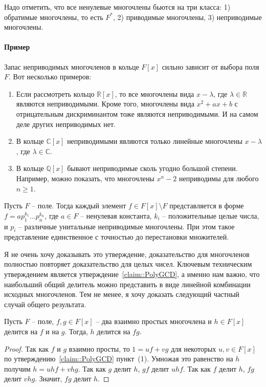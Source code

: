 Надо отметить, что все ненулевые многочлены бьются на три класса: 1) обратимые многочлены, то есть $F^*$, 2) приводимые многочлены, 3) неприводимые многочлены.

\paragraph{Пример}

Запас неприводимых многочленов в кольце $F[x]$ сильно зависит от выбора поля $F$.
Вот несколько примеров:
\begin{enumerate}
\item Если рассмотреть кольцо $\mathbb R[x]$, то все многочлены вида $x - \lambda$, где $\lambda\in \mathbb R$ являются неприводимыми.
Кроме того, многочлены вида $x^2 + ax + b$ с отрицательным дискриминантом тоже являются неприводимыми.
И на самом деле других неприводимых нет.

\item В кольце $\mathbb C[x]$ неприводимыми являются только линейные многочлены $x - \lambda$, где $\lambda \in \mathbb C$.

\item В кольце $\mathbb Q[x]$ бывают неприводимые сколь угодно большой степени.
Например, можно показать, что многочлены $x^n - 2$ неприводимы для любого $n \geqslant 1$.
\end{enumerate}

\begin{claim}
[UFD]
\label{claim::PolyUFD}
Пусть $F$ -- поле.
Тогда каждый элемент $f\in F[x]\setminus F$ представляется в форме $f = a p_1^{k_1}\ldots p_n^{k_n}$, где $a\in F$ -- ненулевая константа, $k_i$ -- положительные целые числа, и $p_i$ -- различные унитальные неприводимые многочлены.
При этом такое представление единственное с точностью до перестановки множителей.
\end{claim}

Я не очень хочу доказывать это утверждение, доказательство для многочленов полностью повторяет доказательство для целых чисел.
Ключевым техническим утверждением является утверждение~\ref{claim::PolyGCD}, а именно нам важно, что наибольший общий делитель можно представить в виде линейной комбинации исходных многочленов.
Тем не менее, я хочу доказать следующий частный случай общего результата.

\begin{claim}
Пусть $F$ -- поле, $f, g\in F[x]$ -- два взаимно простых многочлена и $h\in F[x]$ делится на $f$ и на $g$.
Тогда, $h$ делится на $fg$.
\end{claim}
\begin{proof}
Так как $f$ и $g$ взаимно просты, то $1 = uf + vg$ для некоторых $u,v\in F[x]$ по утверждению~\ref{claim::PolyGCD} пункт~(1).
Умножая это равенство на $h$ получим $h = u hf + v hg$.
Так как $g$ делит $h$, $gf$ делит $uhf$.
Так как $f$ делит $h$, $fg$ делит $vhg$.
Значит, $fg$ делит $h$.
\end{proof}

